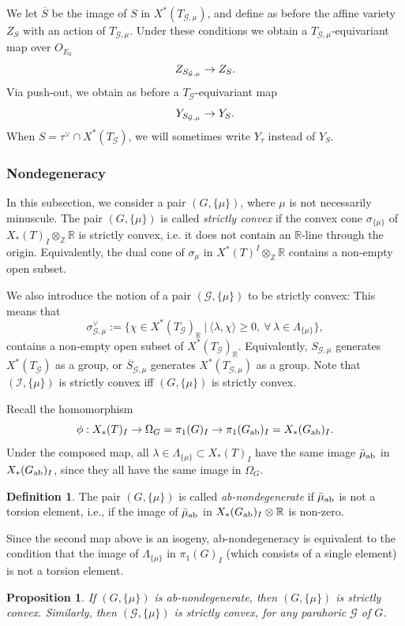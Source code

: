 \documentclass[reqno, 10pt]{amsart}
\makeatletter
\newcommand{\BR}{\ensuremath{\mathbb {R}}\xspace}
\newcommand{\BZ}{\ensuremath{\mathbb {Z}}\xspace}
\newcommand{\CG}{\ensuremath{\mathcal {G}}\xspace}
\newcommand{\CI}{\ensuremath{\mathcal {I}}\xspace}
\newcommand{\ov}{\overline}
\newtheorem{proposition}[subsubsection]{Proposition}
\theoremstyle{definition}
\newtheorem{definition}[subsubsection]{Definition}
\numberwithin{equation}{subsection}
\numberwithin{subsubsection}{subsection}
\renewcommand{\to}{%
   \ifbool{@display}{\longrightarrow}{\rightarrow}%
   }
\makeatother
\begin{document}
We let $\ov S$ be the image of $S$ in $X^*(T_{\CG, \mu})$, and define as before the affine variety $Z_S$
  with an action of $T_{\CG, \mu}$. Under these conditions we obtain a $T_{\CG, \mu}$-equivariant map over $O_{E_0}$ 
\begin{equation}\label{relt}
Z_{S_{\CG,\mu}}\to Z_{S} .
\end{equation}
Via push-out, we obtain as before a $T_{\CG}$-equivariant map
\begin{equation}\label{relt2}
Y_{S_{\CG, \mu}}\to Y_{S} .
\end{equation}
 When $S=\tau^\vee\cap X^*(T_\CG)$, we will sometimes write $Y_\tau$ instead of $Y_S$.
 

\subsubsection{Nondegeneracy}\label{ss:nondegeneracy}

In this subsection, we consider a pair $(G, \{\mu\})$, where $\mu$ is not necessarily minuscule. The pair $(G, \{\mu\})$ is called \emph{strictly convex} if  the convex cone $\sigma_{\{\mu\}}$ of $ X_*(T)_I \otimes_{\BZ}\BR$ is strictly convex, i.e. it does not contain an $\BR$-line through the origin. Equivalently, the dual cone of $\sigma_{\mu}$ in $ X^*(T)^I \otimes_{\BZ}\BR$ contains a non-empty open subset.  

We also introduce the notion of a pair $(\CG, \{\mu\})$ to be strictly convex: This means that 
\[
\sigma^\vee_{\CG, \mu}:=\{ \chi\in X^*(T_\CG)_\BR\ |\ \langle\lambda ,\chi \rangle\geq 0, \ \forall\, \lambda\in \Lambda_{\{\mu\}}\},
\]
 contains a non-empty open subset of $X^*(T_\CG)_\BR$. Equivalently, $S_{\CG, \mu}$ generates $X^*(T_\CG)$ as a group, or $\ov S_{\CG, \mu}$ generates $X^*(T_{\CG, \mu})$ as a group. Note that $(\CI, \{\mu\})$ is strictly convex iff $(G, \{\mu\})$ is strictly convex. 

Recall the homomorphism
\begin{equation}
\phi: X_*(T)_I\to \Omega_G=\pi_1(G)_I\to \pi_1(G_{\rm ab})_I =X_*(G_{\rm ab})_I.
\end{equation}
Under the composed map, all $\lambda\in \Lambda_{\{\mu\}}\subset X_*(T)_I$ have the same image $\bar\mu_{\rm ab}$ in $X_*(G_{\rm ab})_I$, since they all have the same image in $\Omega_G$. 
\begin{definition}\label{defabn}
The pair $(G, \{\mu\})$ is called \emph{ab-nondegenerate} if $\bar\mu_{\rm ab}$ is not a torsion element, i.e., if the image of $\bar\mu_{\rm ab}$ in $ X_*(G_{\rm ab})_I\otimes\BR$ is non-zero.
\end{definition}
Since the second map above is an isogeny, ab-nondegeneracy is equivalent to the condition that the image of $\Lambda_{\{\mu\}}$ in $\pi_1(G)_I$ (which consists of a single element)  is not a torsion element. 
\begin{proposition}\label{propAo}
 If  $(G, \{\mu\})$ is ab-nondegenerate, then $(G, \{\mu\})$ is  strictly convex. Similarly, then $(\CG, \{\mu\})$ is  strictly convex, for any parahoric $\CG$ of $G$.
\end{proposition}
\end{document}
